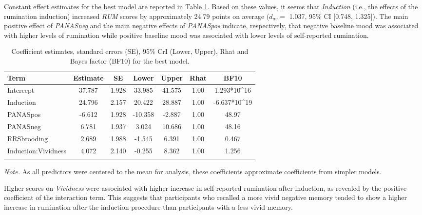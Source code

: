 \documentclass[a4paper,12pt,twoside,openright,oldfontcommands]{memoir}
\begin{document}
Constant effect estimates for the best model are reported in Table \ref{tab:paramexp1}. Based on these values, it seems that \emph{Induction} (i.e., the effects of the rumination induction) increased \emph{RUM} scores by approximately 24.79 points on average (\(d_{av} =\) 1.037, 95\% CI {[}0.748, 1.325{]}). The main positive effect of \emph{PANASneg} and the main negative effects of \emph{PANASpos} indicate, respectively, that negative baseline mood was associated with higher levels of rumination while positive baseline mood was associated with lower levels of self-reported rumination.

\begin{table}[H]
\begin{center}
\begin{threeparttable}
\caption{\label{tab:paramexp1}Coefficient estimates, standard errors (SE), 95\% CrI (Lower, Upper), Rhat and Bayes factor (BF10) for the best model.}
\small{
\begin{tabular}{lcccccc}
\toprule
Term & \multicolumn{1}{c}{Estimate} & \multicolumn{1}{c}{SE} & \multicolumn{1}{c}{Lower} & \multicolumn{1}{c}{Upper} & \multicolumn{1}{c}{Rhat} & \multicolumn{1}{c}{BF10}\\
\midrule
Intercept & 37.787 & 1.928 & 33.985 & 41.575 & 1.00 & 1.293*10\textasciicircum{}16\\
Induction & 24.796 & 2.157 & 20.422 & 28.887 & 1.00 & -6.637*10\textasciicircum{}19\\
PANASpos & -6.612 & 1.928 & -10.358 & -2.887 & 1.00 & 48.97\\
PANASneg & 6.781 & 1.937 & 3.024 & 10.686 & 1.00 & 48.16\\
RRSbrooding & 2.689 & 1.988 & -1.545 & 6.391 & 1.00 & 0.467\\
Induction:Vividness & 4.072 & 2.140 & -0.255 & 8.362 & 1.00 & 1.256\\
\bottomrule
\addlinespace
\end{tabular}
}
\begin{tablenotes}[para]
\textit{Note.} As all predictors were centered to the mean for analysis, these coefficients approximate coefficients from simpler models.
\end{tablenotes}
\end{threeparttable}
\end{center}
\end{table}

Higher scores on \emph{Vividness} were associated with higher increase in self-reported rumination after induction, as revealed by the positive coefficient of the interaction term. This suggests that participants who recalled a more vivid negative memory tended to show a higher increase in rumination after the induction procedure than participants with a less vivid memory.
\end{document}

